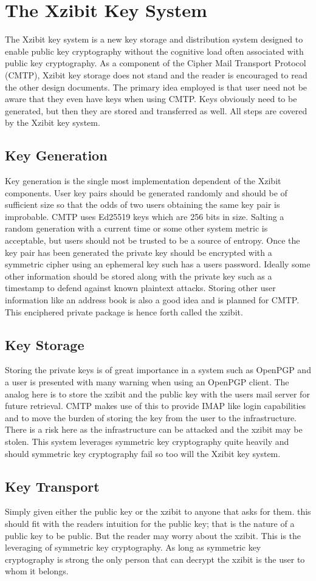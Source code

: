 \documentclass[a4paper,11pt]{article}
\begin{document}
\section{The Xzibit Key System}
The Xzibit key system is a new key storage and distribution system designed to enable public key cryptography without the cognitive load often associated with public key cryptography. As a component of the Cipher Mail Transport Protocol (CMTP), Xzibit key storage does not stand and the reader is encouraged to read the other design documents. The primary idea employed is that user need not be aware that they even have keys when using CMTP. Keys obviously need to be generated, but then they are stored and transferred as well. All steps are covered by the Xzibit key system.
\subsection{Key Generation}
Key generation is the single most implementation dependent of the Xzibit components. User key pairs should be generated randomly and should be of sufficient size so that the odds of two users obtaining the same key pair is improbable. CMTP uses Ed25519 keys which are 256 bits in size. Salting a random generation with a current time or some other system metric is acceptable, but users should not be trusted to be a source of entropy. Once the key pair has been generated the private key should be encrypted with a symmetric cipher using an ephemeral key such has a users password. Ideally some other information should be stored along with the private key such as a timestamp to defend against known plaintext attacks. Storing other user information like an address book is also a good idea and is planned for CMTP. This enciphered private package is hence forth called the xzibit.
\subsection{Key Storage}
Storing the private keys is of great importance in a system such as OpenPGP and a user is presented with many warning when using an OpenPGP client. The analog here is to store the xzibit and the public key with the users mail server for future retrieval. CMTP makes use of this to provide IMAP like login capabilities and to move the burden of storing the key from the user to the infrastructure. There is a risk here as the infrastructure can be attacked and the xzibit may be stolen. This system leverages symmetric key cryptography quite heavily and should symmetric key cryptography fail so too will the Xzibit key system.
\subsection{Key Transport}
Simply given either the public key or the xzibit to anyone that asks for them. this should fit with the readers intuition for the public key; that is the nature of a public key to be public. But the reader may worry about the xzibit. This is the leveraging of symmetric key cryptography. As long as symmetric key cryptography is strong the only person that can decrypt the xzibit is the user to whom it belongs.
\end{document}
